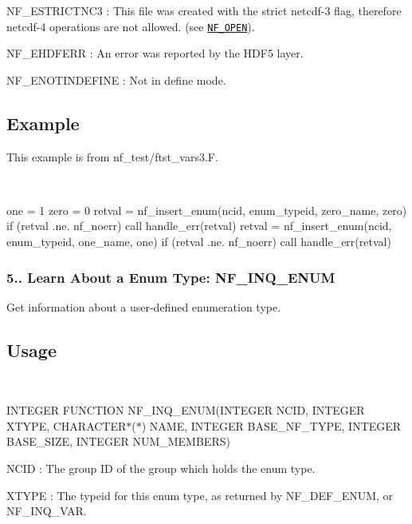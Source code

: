 {\ttfamily N\+F\+\_\+\+E\+S\+T\+R\+I\+C\+T\+N\+C3} \+: This file was created with the strict netcdf-\/3 flag, therefore netcdf-\/4 operations are not allowed. (see \href{#NF_005fOPEN}{\tt N\+F\+\_\+\+O\+P\+EN}).

{\ttfamily N\+F\+\_\+\+E\+H\+D\+F\+E\+RR} \+: An error was reported by the H\+D\+F5 layer.

{\ttfamily N\+F\+\_\+\+E\+N\+O\+T\+I\+N\+D\+E\+F\+I\+NE} \+: Not in define mode.

\subsection*{Example }

This example is from nf\+\_\+test/ftst\+\_\+vars3.\+F.

 

\begin{DoxyVerb}  one = 1
  zero = 0
  retval = nf_insert_enum(ncid, enum_typeid, zero_name, zero)
  if (retval .ne. nf_noerr) call handle_err(retval)
  retval = nf_insert_enum(ncid, enum_typeid, one_name, one)
  if (retval .ne. nf_noerr) call handle_err(retval)
\end{DoxyVerb}


\subsubsection*{5.. Learn About a Enum Type\+: N\+F\+\_\+\+I\+N\+Q\+\_\+\+E\+N\+UM}

Get information about a user-\/defined enumeration type.

\subsection*{Usage }

 

I\+N\+T\+E\+G\+ER F\+U\+N\+C\+T\+I\+ON N\+F\+\_\+\+I\+N\+Q\+\_\+\+E\+N\+UM(I\+N\+T\+E\+G\+ER N\+C\+ID, I\+N\+T\+E\+G\+ER X\+T\+Y\+PE, C\+H\+A\+R\+A\+C\+T\+E\+R$\ast$($\ast$) N\+A\+ME, I\+N\+T\+E\+G\+ER B\+A\+S\+E\+\_\+\+N\+F\+\_\+\+T\+Y\+PE, I\+N\+T\+E\+G\+ER B\+A\+S\+E\+\_\+\+S\+I\+ZE, I\+N\+T\+E\+G\+ER N\+U\+M\+\_\+\+M\+E\+M\+B\+E\+RS)

{\ttfamily N\+C\+ID} \+: The group ID of the group which holds the enum type.

{\ttfamily X\+T\+Y\+PE} \+: The typeid for this enum type, as returned by N\+F\+\_\+\+D\+E\+F\+\_\+\+E\+N\+UM, or N\+F\+\_\+\+I\+N\+Q\+\_\+\+V\+AR.

